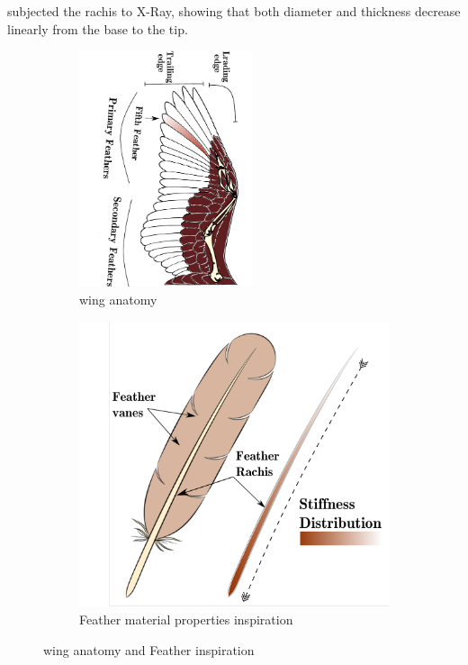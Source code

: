 \citet{Pabisch2010KeratinAlba} subjected the rachis to X-Ray, showing that both diameter and thickness decrease linearly from the base to the tip.



\begin{figure}[ht!]
\centering
\begin{subfigure}{.55\textwidth}
\centering
\includegraphics[width=2in, angle=90]{Figures/wing-primarySecondary.pdf}
\caption{wing anatomy}
\label{fig:anatomy} 
\end{subfigure}
\begin{subfigure}{.4\textwidth}
\centering
\includegraphics[width=.85\columnwidth]{Figures/shaft_drawing.pdf}
\caption{Feather material properties inspiration}\label{fig:inspiration} 
\end{subfigure}
\caption{wing anatomy and Feather inspiration}
\label{fig:Ggeometry}
\end{figure}





